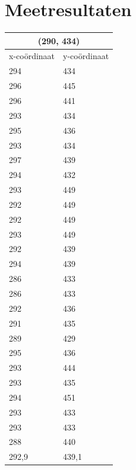 \documentclass{article}
\begin{document}
\section{Meetresultaten}
\label{Meetresultaten}
\begin{tabular}{ |l|l| }
  \hline
  \multicolumn{2}{|c|}{(290, 434)} \\
  \hline
  x-co\"ordinaat & y-co\"ordinaat \\ \hline
     294 & 434\\ \hline
     296 & 445\\ \hline
     296 & 441\\ \hline
     293 & 434\\ \hline
     295 & 436\\ \hline
     293 & 434\\ \hline
     297 & 439\\ \hline
     294 & 432\\ \hline
     293 & 449\\ \hline
     292 & 449\\ \hline
     292 & 449\\ \hline
     293 & 449\\ \hline
     292 & 439\\ \hline
     294 & 439\\ \hline
     286 & 433\\ \hline
     286 & 433\\ \hline
     292 & 436\\ \hline
     291 & 435\\ \hline
     289 & 429\\ \hline
     295 & 436\\ \hline
     293 & 444\\ \hline
     293 & 435\\ \hline
     294 & 451\\ \hline
     293 & 433\\ \hline
     293 & 433\\ \hline
     288 & 440\\ \hline\hline
     292,9 & 439,1 \\ \hline
\end{tabular}
\end{document}
